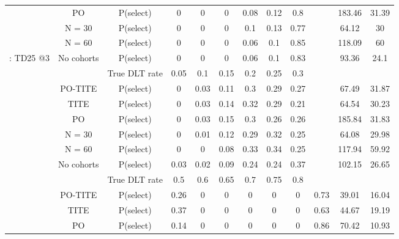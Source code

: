 \begin{table}
\begin{singlespace}
{\begin{tabular}[t]{cccccccccccc}
				& PO & P(select) & 0 & 0 & 0 & 0.08 & 0.12 & 0.8 &  & 183.46 & 31.39\\
				
				& N = 30 & P(select) & 0 & 0 & 0 & 0.1 & 0.13 & 0.77 &  & 64.12 & 30\\
				
				& N = 60 & P(select) & 0 & 0 & 0 & 0.06 & 0.1 & 0.85 &  & 118.09 & 60\\
				
				\multirow{-7}{*}{\centering\arraybackslash 6: TD25 @3} & No cohorts & P(select) & 0 & 0 & 0 & 0.06 & 0.1 & 0.83 &  & 93.36 & 24.1\\
				\cmidrule{1-12}
				\rowcolor{gray!6}   &  & True DLT rate & 0.05 & 0.1 & 0.15 & 0.2 & 0.25 & 0.3 &  &  & \\
				
				\rowcolor{gray!6}   & PO-TITE & P(select) & 0 & 0.03 & 0.11 & 0.3 & 0.29 & 0.27 &  & 67.49 & 31.87\\
				
				\rowcolor{gray!6}   & TITE & P(select) & 0 & 0.03 & 0.14 & 0.32 & 0.29 & 0.21 &  & 64.54 & 30.23\\
				
				\rowcolor{gray!6}   & PO & P(select) & 0 & 0.03 & 0.15 & 0.3 & 0.26 & 0.26 &  & 185.84 & 31.83\\
				
				\rowcolor{gray!6}   & N = 30 & P(select) & 0 & 0.01 & 0.12 & 0.29 & 0.32 & 0.25 &  & 64.08 & 29.98\\
				
				\rowcolor{gray!6}   & N = 60 & P(select) & 0 & 0 & 0.08 & 0.33 & 0.34 & 0.25 &  & 117.94 & 59.92\\
				
				\rowcolor{gray!6}  \multirow{-7}{*}{\centering\arraybackslash 7: Equal steps} & No cohorts & P(select) & 0.03 & 0.02 & 0.09 & 0.24 & 0.24 & 0.37 &  & 102.15 & 26.65\\
				\cmidrule{1-12}
				&  & True DLT rate & 0.5 & 0.6 & 0.65 & 0.7 & 0.75 & 0.8 &  &  & \\
				
				& PO-TITE & P(select) & 0.26 & 0 & 0 & 0 & 0 & 0 & 0.73 & 39.01 & 16.04\\
				
				& TITE & P(select) & 0.37 & 0 & 0 & 0 & 0 & 0 & 0.63 & 44.67 & 19.19\\
				
				& PO & P(select) & 0.14 & 0 & 0 & 0 & 0 & 0 & 0.86 & 70.42 & 10.93\\
				

\end{tabular}}
\end{singlespace}
\end{table}
